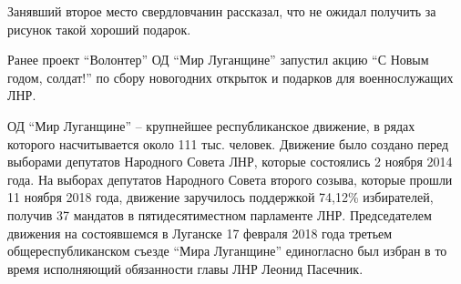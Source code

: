 Занявший второе место свердловчанин рассказал, что не ожидал получить за
рисунок такой хороший подарок.

Ранее проект \enquote{Волонтер} ОД \enquote{Мир Луганщине} запустил акцию \enquote{С Новым годом,
солдат!} по сбору новогодних открыток и подарков для военнослужащих ЛНР.

ОД \enquote{Мир Луганщине} – крупнейшее республиканское движение, в рядах
которого насчитывается около 111 тыс. человек. Движение было создано перед
выборами депутатов Народного Совета ЛНР, которые состоялись 2 ноября 2014 года.
На выборах депутатов Народного Совета второго созыва, которые прошли 11 ноября
2018 года, движение заручилось поддержкой 74,12\% избирателей, получив 37
мандатов в пятидесятиместном парламенте ЛНР. Председателем движения на
состоявшемся в Луганске 17 февраля 2018 года третьем общереспубликанском съезде
\enquote{Мира Луганщине} единогласно был избран в то время исполняющий
обязанности главы ЛНР Леонид Пасечник.
